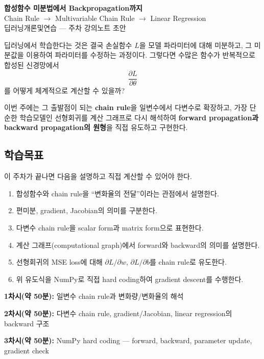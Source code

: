 \documentclass[11pt,a4paper]{article}
\begin{document}
\begin{center}
{\LARGE\bfseries 합성함수 미분법에서 Backpropagation까지}\\[0.35em]
{\Large Chain Rule $\rightarrow$ Multivariable Chain Rule $\rightarrow$ Linear Regression}\\[0.8em]
{\large 딥러닝개론및연습 --- 주차 강의노트 초안}
\end{center}

\vspace{0.4em}

\begin{keybox}[이번 주의 핵심 질문]
딥러닝에서 학습한다는 것은 결국 손실함수 $L$을 모델 파라미터에 대해 미분하고,
그 미분값을 이용하여 파라미터를 수정하는 과정이다. 그렇다면 수많은 함수가 반복적으로
합성된 신경망에서
\[
\frac{\partial L}{\partial \theta}
\]
를 어떻게 체계적으로 계산할 수 있을까?

이번 주에는 그 출발점이 되는 \textbf{chain rule}을 일변수에서 다변수로 확장하고,
가장 단순한 학습모델인 선형회귀를 계산 그래프로 다시 해석하여
\textbf{forward propagation과 backward propagation의 원형}을 직접 유도하고 구현한다.
\end{keybox}

\subsection*{학습목표}
이 주차가 끝나면 다음을 설명하고 직접 계산할 수 있어야 한다.
\begin{enumerate}[label=\arabic*.]
\item 합성함수와 chain rule을 ``변화율의 전달''이라는 관점에서 설명한다.
\item 편미분, gradient, Jacobian의 의미를 구분한다.
\item 다변수 chain rule을 scalar form과 matrix form으로 표현한다.
\item 계산 그래프(computational graph)에서 forward와 backward의 의미를 설명한다.
\item 선형회귀의 MSE loss에 대해 $\partial L/\partial w$, $\partial L/\partial b$를 chain rule로 유도한다.
\item 위 유도식을 NumPy로 직접 hard coding하여 gradient descent를 수행한다.
\end{enumerate}

\begin{remarkbox}[권장 시간 구성]
\textbf{1차시(약 50분):} 일변수 chain rule과 변화량/변화율의 해석

\textbf{2차시(약 50분):} 다변수 chain rule, gradient/Jacobian, linear regression의 backward 구조

\textbf{3차시(약 50분):} NumPy hard coding --- forward, backward, parameter update, gradient check
\end{remarkbox}
\end{document}
